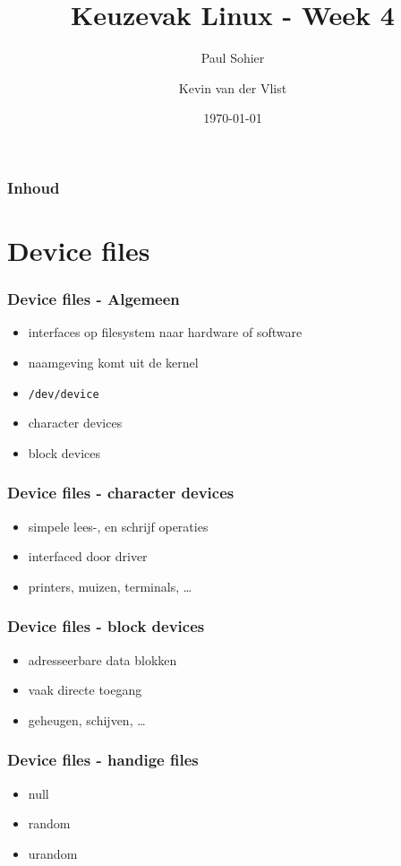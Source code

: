 \documentclass{beamer}
\title{Keuzevak Linux - Week 4}
\author{Paul Sohier \and Kevin van der Vlist}
\institute{Versie $1.0$}
\date{\today}
\begin{document}
\begin{frame}
  \titlepage
\end{frame} 

\begin{frame}
  \frametitle{Inhoud}
  \tableofcontents
\end{frame}

\section{Device files}

\begin{frame}
  \frametitle{Device files - Algemeen}
  \begin{itemize}
  \item<1-> interfaces op filesystem naar hardware of software
  \item<2-> naamgeving komt uit de kernel
  \item<3-> \texttt{/dev/device}
  \item<4-> character devices
  \item<5-> block devices
  \end{itemize}
\end{frame}

\begin{frame}
  \frametitle{Device files - character devices}
  \begin{itemize}
  \item<1-> simpele lees-, en schrijf operaties
  \item<2-> interfaced door driver
  \item<3-> printers, muizen, terminals, \ldots
  \end{itemize}
\end{frame}

\begin{frame}
  \frametitle{Device files - block devices}
  \begin{itemize}
  \item<1-> adresseerbare data blokken
  \item<2-> vaak directe toegang
  \item<3-> geheugen, schijven, \ldots
  \end{itemize}
\end{frame}

\begin{frame}
  \frametitle{Device files - handige files}
  \begin{itemize}
  \item<1-> null
  \item<2-> random %
  \item<3-> urandom %
  \end{itemize}
\end{frame}
\end{document}

